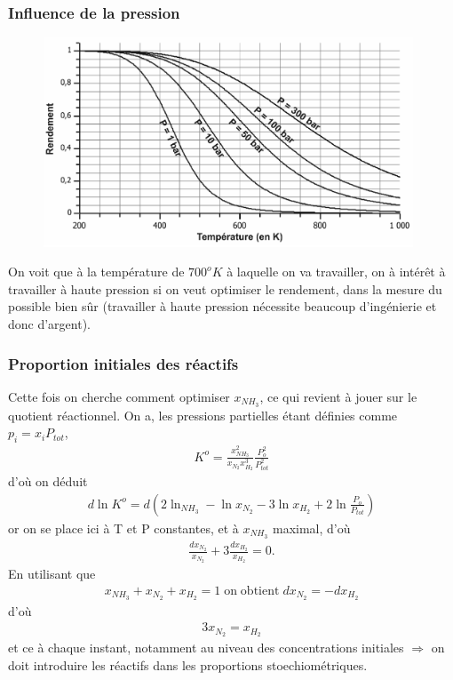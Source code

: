 \documentclass[12pt,prb,aps,epsf]{report}
\begin{document}
\subsubsection{Influence de la pression}
\begin{figure}[h]
	\centerline{\includegraphics[width=11cm]{pression}}
\end{figure}
On voit que à la température de $700^o K$ à laquelle on va travailler, on à intérêt à travailler à haute pression si on veut optimiser le rendement, dans la mesure du possible bien sûr (travailler à haute pression nécessite beaucoup d'ingénierie et donc d'argent).

\subsubsection{Proportion initiales des réactifs}
Cette fois on cherche comment optimiser $x_{NH_3}$, ce qui revient à jouer sur le quotient réactionnel. On a, les pressions partielles étant définies comme $p_i = x_iP_{tot}$, 
\begin{eqnarray}
K^o = \frac{x_{NH_3}^2}{x_{N_2}x_{H_2}^3}\frac{P_o^2}{P_{tot}^2}
\end{eqnarray}
d'où on déduit 
\begin{eqnarray}
d\ln K^o = d\left(2\ln _{NH_3} - \ln x_{N_2} - 3 \ln x_{H_2} + 2\ln \frac{P_o}{P_{tot}}\right)
\end{eqnarray}
or on se place ici à T et P constantes, et à $x_{NH_3}$ maximal, d'où
\begin{eqnarray}
\frac{dx_{N_2}}{x_{N_2}}  + 3\frac{dx_{H_2}}{x_{H_2}} = 0.
\end{eqnarray}
En utilisant que 
\begin{eqnarray}
x_{NH_3} + x_{N_2} + x_{H_2} =1 \;\mathrm{on\;obtient} \;d x_{N_2} = -dx_{H_2}
\end{eqnarray}
d'où 
\begin{eqnarray}
3x_{N_2} = x_{H_2}
\end{eqnarray}
et ce à chaque instant, notamment au niveau des concentrations initiales $\Rightarrow$ on doit introduire les réactifs dans les proportions stoechiométriques.
\end{document}
